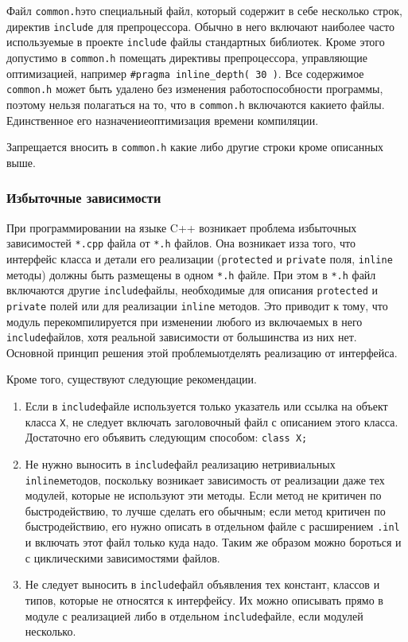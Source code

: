 Файл \lstinline|common.h|\mdash это специальный файл, который содержит в себе несколько строк, директив \lstinline|include| для препроцессора. Обычно в него включают наиболее часто используемые в проекте \lstinline|include| файлы стандартных библиотек. Кроме этого допустимо в \lstinline|common.h| помещать директивы препроцессора, управляющие оптимизацией, например \lstinline|#pragma inline_depth( 30 )|. Все содержимое \lstinline|common.h| может быть удалено без изменения работоспособности программы, поэтому нельзя полагаться на то, что в \lstinline|common.h| включаются какие\sdash то файлы. Единственное его назначение\mdash оптимизация времени компиляции.

Запрещается вносить в \lstinline|common.h| какие либо другие строки кроме описанных выше.

\subsubsection{Избыточные зависимости}

При программировании на языке C++ возникает проблема избыточных зависимостей \lstinline|*.cpp| файла от \lstinline|*.h| файлов. Она возникает из\sdash за того, что интерфейс класса и детали его реализации (\lstinline|protected| и \lstinline|private| поля, \lstinline|inline| методы) должны быть размещены в одном \lstinline|*.h| файле. При этом в \lstinline|*.h| файл включаются другие \lstinline|include|\sdash файлы, необходимые для описания \lstinline|protected| и \lstinline|private| полей или для реализации \lstinline|inline| методов. Это приводит к тому, что модуль перекомпилируется при изменении любого из включаемых в него \lstinline|include|\sdash файлов, хотя реальной зависимости от большинства из них нет. Основной принцип решения этой проблемы\mdash отделять реализацию от интерфейса.

Кроме того, существуют следующие рекомендации.

\begin{enumerate}
\item Если в \lstinline|include|\sdash файле используется только указатель или ссылка на объект класса \lstinline|X|, не следует включать заголовочный файл с описанием этого класса. Достаточно его объявить следующим способом: \lstinline|class X;|
%
\item Не нужно выносить в \lstinline|include|\sdash файл реализацию нетривиальных \lstinline|inline|\sdash методов, поскольку возникает зависимость от реализации даже тех модулей, которые не используют эти методы. Если метод не критичен по быстродействию, то лучше сделать его обычным; если метод критичен по быстродействию, его нужно описать в отдельном файле с расширением \lstinline|.inl| и включать этот файл только куда надо. Таким же образом можно бороться и с циклическими зависимостями файлов.
%
\item Не следует выносить в \lstinline|include|\sdash файл объявления тех констант, классов и типов, которые не относятся к интерфейсу. Их можно описывать прямо в модуле с реализацией либо в отдельном \lstinline|include|\sdash файле, если модулей несколько.
\end{enumerate}